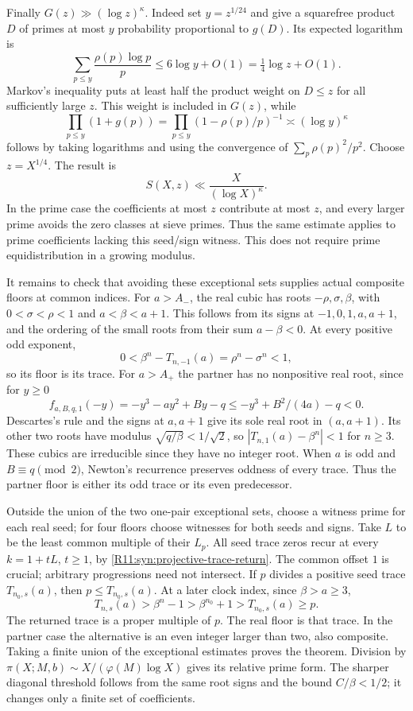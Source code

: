 \documentclass[11pt,a4paper]{article}
\theoremstyle{definition}\newtheorem{definition}[theorem]{Definition}
\theoremstyle{remark}\newtheorem{remark}[theorem]{Remark}
\begin{document}
Finally $G(z)\gg(\log z)^\kappa$.
Indeed set $y=z^{1/24}$ and give a squarefree product $D$ of primes
at most $y$ probability proportional to $g(D)$.
Its expected logarithm is
\[
 \sum_{p\le y}\frac{\rho(p)\log p}{p}
 \le6\log y+O(1)=\tfrac14\log z+O(1).
\]
Markov's inequality puts at least half the product weight on $D\le z$
for all sufficiently large $z$. This weight is included in $G(z)$,
while
\[
 \prod_{p\le y}(1+g(p))
   =\prod_{p\le y}(1-\rho(p)/p)^{-1}
   \asymp(\log y)^\kappa
\]
follows by taking logarithms and using the convergence of
$\sum_p\rho(p)^2/p^2$.
Choose $z=X^{1/4}$. The result is
\[
 S(X,z)\ll\frac{X}{(\log X)^\kappa}.
\]
In the prime case the coefficients at most $z$ contribute at most
$z$, and every larger prime avoids the zero classes at sieve primes.
Thus the same estimate applies to prime coefficients lacking this
seed/sign witness. This does not require prime equidistribution
in a growing modulus.

It remains to check that avoiding these exceptional sets supplies
actual composite floors at common indices. For $a>A_-$, the real
cubic has roots $-\rho,\sigma,\beta$, with
$0<\sigma<\rho<1$ and $a<\beta<a+1$. This follows from its signs
at $-1,0,1,a,a+1$, and the ordering of the small roots from their sum
$a-\beta<0$. At every positive odd exponent,
\[
 0<\beta^n-T_{n,-1}(a)=\rho^n-\sigma^n<1,
\]
so its floor is its trace. For $a>A_+$ the partner has no nonpositive
real root, since for $y\ge0$
\[
 f_{a,B,q,1}(-y)=-y^3-ay^2+By-q
       \le-y^3+B^2/(4a)-q<0.
\]
Descartes's rule and the signs at $a,a+1$ give its sole real root
in $(a,a+1)$. Its other two roots have modulus $\sqrt{q/\beta}<1/\sqrt2$,
so $|T_{n,1}(a)-\beta^n|<1$ for $n\ge3$.
These cubics are irreducible since they have no integer root.
When $a$ is odd and $B\equiv q\pmod2$, Newton's recurrence preserves
oddness of every trace. Thus the partner floor is either its odd
trace or its even predecessor.

Outside the union of the two one-pair exceptional sets, choose a
witness prime for each real seed; for four floors choose witnesses
for both seeds and signs. Take $L$ to be the least common multiple
of their $L_p$. All seed trace zeros recur at every
$k=1+tL$, $t\ge1$, by \eqref{R11:syn:projective-trace-return}.
The common offset $1$ is crucial; arbitrary progressions need not
intersect. If $p$ divides a positive seed trace $T_{n_0,s}(a)$, then
$p\le T_{n_0,s}(a)$. At a later clock index, since $\beta>a\ge3$,
\[
 T_{n,s}(a)>\beta^n-1>\beta^{n_0}+1>T_{n_0,s}(a)\ge p.
\]
The returned trace is a proper multiple of $p$. The real floor is
that trace. In the partner case the alternative is an even integer
larger than two, also composite. Taking a finite union of the
exceptional estimates proves the theorem. Division by
$\pi(X;M,b)\sim X/(\varphi(M)\log X)$ gives its relative prime form.
The sharper diagonal threshold follows from the same root signs
and the bound $C/\beta<1/2$; it changes only a finite set of coefficients.
\end{document}

